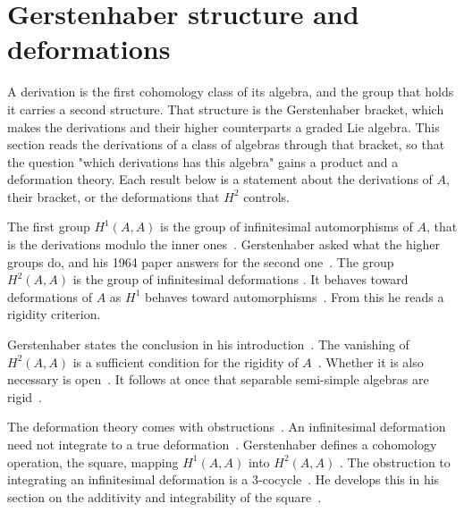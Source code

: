 \section{Gerstenhaber structure and deformations}\label{sec:cohomology:gerstenhaber}

A derivation is the first cohomology class of its algebra, and the group that
holds it carries a second structure. That structure is the Gerstenhaber
bracket, which makes the
derivations and their higher counterparts a graded Lie algebra. This section reads
the derivations of a class of algebras through that bracket, so that the
question "which derivations has this algebra" gains a product and a
deformation theory. Each result below is a statement about the derivations of
$A$, their bracket, or the deformations that $H^2$ controls.

The first group $H^1(A,A)$ is the group of infinitesimal automorphisms of $A$,
that is the derivations modulo the inner
ones~\cite[pp.~59--60]{Gerstenhaber1964}. Gerstenhaber asked what the higher
groups do, and his 1964 paper answers for the second
one~\cite[pp.~59--60]{Gerstenhaber1964}. The group $H^2(A,A)$ is the group of
infinitesimal deformations
\cite[pp.~59--60]{Gerstenhaber1964}. It behaves toward deformations of $A$ as
$H^1$ behaves toward
automorphisms~\cite[pp.~59--60]{Gerstenhaber1964}. From this he reads a
rigidity criterion.

Gerstenhaber states the conclusion in his
introduction~\cite[p.~60]{Gerstenhaber1964}. The vanishing of $H^2(A,A)$ is a
sufficient condition for the rigidity of $A$~\cite[p.~60]{Gerstenhaber1964}.
Whether it is also necessary is open~\cite[p.~60]{Gerstenhaber1964}. It
follows at once that separable semi-simple algebras are
rigid~\cite[pp.~59--60]{Gerstenhaber1964}.

The deformation theory comes with obstructions~\cite[\S 6]{Gerstenhaber1964}.
An infinitesimal deformation need not integrate to a true deformation~\cite[\S
6]{Gerstenhaber1964}. Gerstenhaber defines a cohomology operation, the square,
mapping $H^1(A,A)$ into $H^2(A,A)$ \cite[\S 6]{Gerstenhaber1964}. The
obstruction to integrating an infinitesimal deformation is a
$3$-cocycle~\cite[pp.~60--61, \S 6]{Gerstenhaber1964}. He develops this in his
section on the additivity and integrability of the square~\cite[pp.~60--61, \S
6]{Gerstenhaber1964}.

